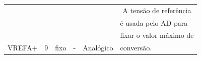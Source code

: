 \begin{table}[H]
\begin{tabular}{|c|c|c|c|c|c|}
		\hline
		&                                &                                   &                             &                               & A tensão de referência                      \\
		&                                &                                   &                             &                               & \multicolumn{1}{l|}{é usada pelo AD para}    \\
		&                                &                                   &                             &                               & \multicolumn{1}{l|}{fixar o valor máximo de} \\
		\multirow{-4}{*}{VREFA+}    & \multirow{-4}{*}{9}            & \multirow{-4}{*}{fixo}            & \multirow{-4}{*}{-}         & \multirow{-4}{*}{Analógico}   & \multicolumn{1}{l|}{conversão.}  \\ 
		\hline           
	\end{tabular}
\end{table}

